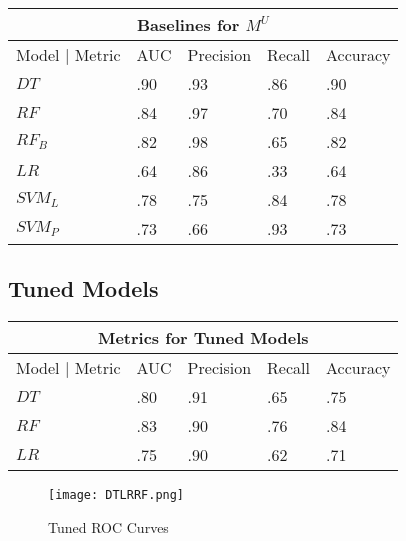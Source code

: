 \documentclass[12pt, a4paper]{article} %
\begin{document}
\begin{tabular}{ |p{3cm}||p{2cm}|p{2cm}|p{2cm}|p{2cm}|}
 \hline
 \multicolumn{5}{|c|}{Baselines for $M^{U}$} \\
 \hline
 Model | Metric & AUC  & Precision & Recall & Accuracy  \\
 \hline
 $DT$  & .90 & .93 & .86 & .90 \\
 $RF$  & .84 & .97 & .70 & .84 \\
 $RF_B$   & .82 & .98 & .65 & .82 \\
 $LR$   & .64 & .86 & .33 & .64 \\
 $SVM_L$  & .78 & .75 & .84 & .78 \\
 $SVM_P$  & .73 & .66 & .93 & .73 \\
 \hline
\end{tabular}


\newpage
\subsection*{Tuned Models}

\begin{tabular}{|p{3cm}||p{2cm}|p{2cm}|p{2cm}|p{2cm}|}
 \hline
 \multicolumn{5}{|c|}{Metrics for Tuned Models} \\
 \hline
 Model | Metric & AUC  & Precision & Recall & Accuracy  \\
 \hline
 $DT$  & .80 & .91 & .65 & .75 \\
 $RF$  & .83 & .90 & .76 & .84 \\
 $LR$   & .75 & .90 & .62 & .71 \\
 \hline
\end{tabular}

\begin{figure}[h]
\centering
\texttt{[image: DTLRRF.png]} 
\caption{Tuned ROC Curves}
\end{figure}
\end{document}
